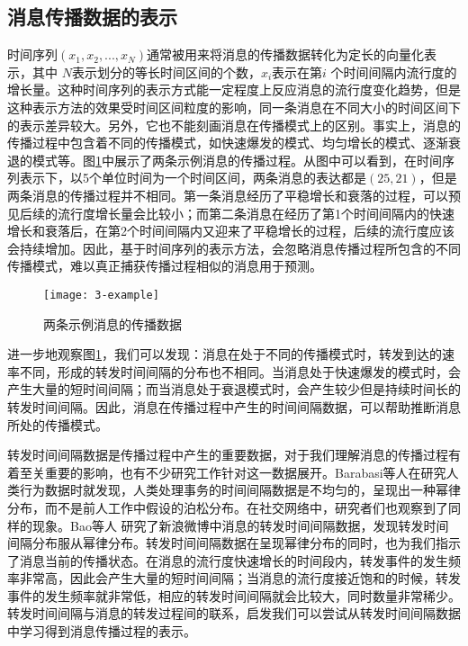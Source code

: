 \subsection{消息传播数据的表示}
时间序列$(x_1,x_2,...,x_N)$通常被用来将消息的传播数据转化为定长的向量化表示，其中 $N$表示划分的等长时间区间的个数，$x_i$表示在第$i$ 个时间间隔内流行度的增长量。这种时间序列的表示方式能一定程度上反应消息的流行度变化趋势，但是这种表示方法的效果受时间区间粒度的影响，同一条消息在不同大小的时间区间下的表示差异较大。另外，它也不能刻画消息在传播模式上的区别。事实上，消息的传播过程中包含着不同的传播模式，如快速爆发的模式、均匀增长的模式、逐渐衰退的模式等。图\ref{fig:example}中展示了两条示例消息的传播过程。从图中可以看到，在时间序列表示下，以5个单位时间为一个时间区间，两条消息的表达都是$(25,21)$，但是两条消息的传播过程并不相同。第一条消息经历了平稳增长和衰落的过程，可以预见后续的流行度增长量会比较小；而第二条消息在经历了第1个时间间隔内的快速增长和衰落后，在第2个时间间隔内又迎来了平稳增长的过程，后续的流行度应该会持续增加。因此，基于时间序列的表示方法，会忽略消息传播过程所包含的不同传播模式，难以真正捕获传播过程相似的消息用于预测。
\begin{figure}[!htbp]
  \centering
  \texttt{[image: 3-example]}
  \caption{两条示例消息的传播数据}
  \label{fig:example}
\end{figure}

进一步地观察图\ref{fig:example}，我们可以发现：消息在处于不同的传播模式时，转发到达的速率不同，形成的转发时间间隔的分布也不相同。当消息处于快速爆发的模式时，会产生大量的短时间间隔；而当消息处于衰退模式时，会产生较少但是持续时间长的转发时间间隔。因此，消息在传播过程中产生的时间间隔数据，可以帮助推断消息所处的传播模式。

转发时间间隔数据是传播过程中产生的重要数据，对于我们理解消息的传播过程有着至关重要的影响，也有不少研究工作针对这一数据展开。Barabasi等人\citep{barabasi05}在研究人类行为数据时就发现，人类处理事务的时间间隔数据是不均匀的，呈现出一种幂律分布，而不是前人工作中假设的泊松分布。在社交网络中，研究者们也观察到了同样的现象。Bao等人\citep{bao2013cumulative} 研究了新浪微博中消息的转发时间间隔数据，发现转发时间间隔分布服从幂律分布。转发时间间隔数据在呈现幂律分布的同时，也为我们指示了消息当前的传播状态。在消息的流行度快速增长的时间段内，转发事件的发生频率非常高，因此会产生大量的短时间间隔；当消息的流行度接近饱和的时候，转发事件的发生频率就非常低，相应的转发时间间隔就会比较大，同时数量非常稀少。转发时间间隔与消息的转发过程间的联系，启发我们可以尝试从转发时间间隔数据中学习得到消息传播过程的表示。

